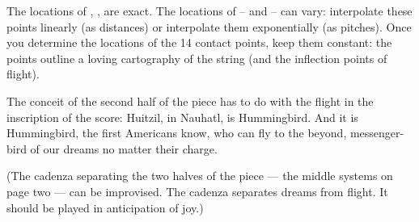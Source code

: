The locations of 
,
,
are exact.
The locations of
 --
and 
 --
can vary:
interpolate these points linearly (as distances) or interpolate them
exponentially (as pitches). Once you determine the locations of the 14 contact
points, keep them constant: the points outline a loving cartography of the
string (and the inflection points of flight).

The conceit of the second half of the piece has to do with the flight in the
inscription of the score: Huitzil, in Nauhatl, is Hummingbird. And it is
Hummingbird, the first Americans know, who can fly to the beyond,
messenger-bird of our dreams no matter their charge.

(The cadenza separating the two halves of the piece --- the middle systems on
page two --- can be improvised. The cadenza separates dreams from flight. It
should be played in anticipation of joy.)
